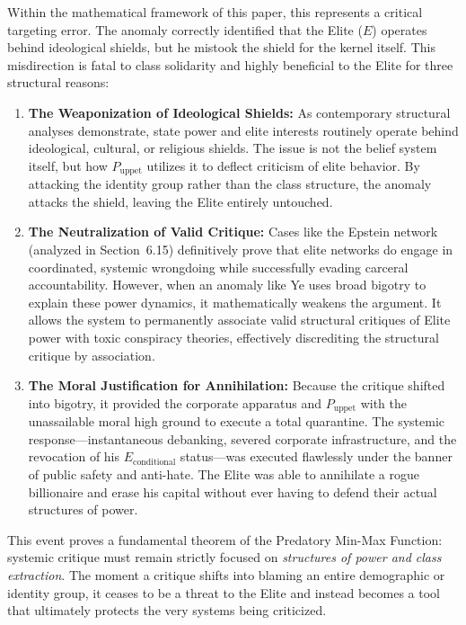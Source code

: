\documentclass[12pt,openany]{book}
\begin{document}
Within the mathematical framework of this paper, this represents a critical targeting error. The anomaly correctly identified that the Elite ($E$) operates behind ideological shields, but he mistook the shield for the kernel itself. This misdirection is fatal to class solidarity and highly beneficial to the Elite for three structural reasons:

\begin{enumerate}
    \item \textbf{The Weaponization of Ideological Shields:} As contemporary structural analyses demonstrate, state power and elite interests routinely operate behind ideological, cultural, or religious shields. The issue is not the belief system itself, but how $P_{\text{uppet}}$ utilizes it to deflect criticism of elite behavior. By attacking the identity group rather than the class structure, the anomaly attacks the shield, leaving the Elite entirely untouched.

    \item \textbf{The Neutralization of Valid Critique:} Cases like the Epstein network (analyzed in Section~6.15) definitively prove that elite networks do engage in coordinated, systemic wrongdoing while successfully evading carceral accountability. However, when an anomaly like Ye uses broad bigotry to explain these power dynamics, it mathematically weakens the argument. It allows the system to permanently associate valid structural critiques of Elite power with toxic conspiracy theories, effectively discrediting the structural critique by association.

    \item \textbf{The Moral Justification for Annihilation:} Because the critique shifted into bigotry, it provided the corporate apparatus and $P_{\text{uppet}}$ with the unassailable moral high ground to execute a total quarantine. The systemic response---instantaneous debanking, severed corporate infrastructure, and the revocation of his $E_{\text{conditional}}$ status---was executed flawlessly under the banner of public safety and anti-hate. The Elite was able to annihilate a rogue billionaire and erase his capital without ever having to defend their actual structures of power.
\end{enumerate}

This event proves a fundamental theorem of the Predatory Min-Max Function: systemic critique must remain strictly focused on \textit{structures of power and class extraction}. The moment a critique shifts into blaming an entire demographic or identity group, it ceases to be a threat to the Elite and instead becomes a tool that ultimately protects the very systems being criticized.
\end{document}
